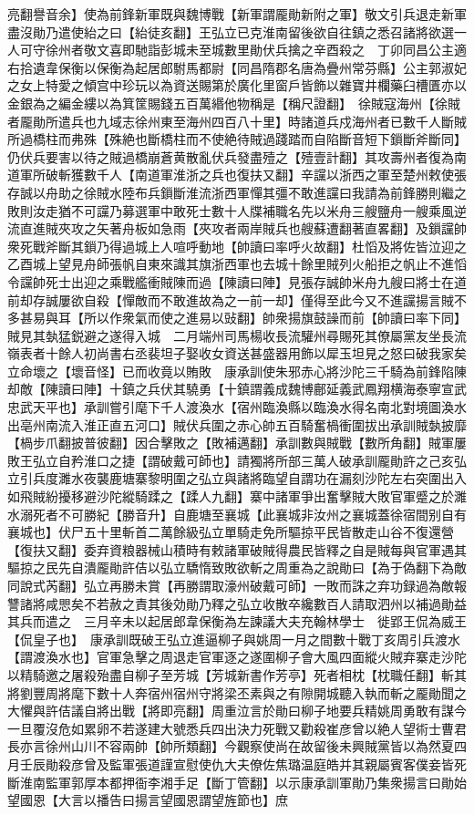 亮翻譽音余】使為前鋒新軍既與魏博戰【新軍謂龎勛新附之軍】敬文引兵退走新軍盡沒勛乃遣使紿之曰【紿徒亥翻】王弘立已克淮南留後欲自往鎮之悉召諸將欲選一人可守徐州者敬文喜即馳詣彭城未至城數里勛伏兵擒之辛酉殺之　丁卯同昌公主適右拾遺韋保衡以保衡為起居郎駙馬都尉【同昌隋郡名唐為疊州常芬縣】公主郭淑妃之女上特愛之傾宫中珍玩以為資送賜第於廣化里窗戶皆飾以雜寶井欄藥臼槽匱亦以金銀為之編金縷以為箕筐賜錢五百萬緡他物稱是【稱尺證翻】　徐賊寇海州【徐賊者龎勛所遣兵也九域志徐州東至海州四百八十里】時諸道兵戍海州者已數千人斷賊所過橋柱而弗殊【殊絶也斷橋柱而不使絶待賊過踐踏而自陷斷音短下鎻斷斧斷同】仍伏兵要害以待之賊過橋崩蒼黄散亂伏兵發盡殪之【殪壹計翻】其攻壽州者復為南道軍所破斬獲數千人【南道軍淮浙之兵也復扶又翻】辛讜以浙西之軍至楚州敕使張存誠以舟助之徐賊水陸布兵鎻斷淮流浙西軍憚其彊不敢進讜曰我請為前鋒勝則繼之敗則汝走猶不可讜乃募選軍中敢死士數十人牒補職名先以米舟三艘鹽舟一艘乘風逆流直進賊夾攻之矢著舟板如急雨【夾攻者兩岸賊兵也艘蘇遭翻著直畧翻】及鎻讜帥衆死戰斧斷其鎻乃得過城上人喧呼動地【帥讀曰率呼火故翻】杜慆及將佐皆泣迎之乙酉城上望見舟師張帆自東來識其旗浙西軍也去城十餘里賊列火船拒之帆止不進慆令讜帥死士出迎之乘戰艦衝賊陳而過【陳讀曰陣】見張存誠帥米舟九艘曰將士在道前却存誠屢欲自殺【憚敵而不敢進故為之一前一却】僅得至此今又不進讜揚言賊不多甚易與耳【所以作衆氣而使之進易以䜴翻】帥衆揚旗鼓譟而前【帥讀曰率下同】賊見其埶猛鋭避之遂得入城　二月端州司馬楊收長流驩州尋賜死其僚屬黨友坐長流嶺表者十餘人初尚書右丞裴坦子娶收女資送甚盛器用飾以犀玉坦見之怒曰破我家矣立命壞之【壞音怪】已而收竟以賄敗　康承訓使朱邪赤心將沙陀三千騎為前鋒陷陳却敵【陳讀曰陣】十鎮之兵伏其驍勇【十鎮謂義成魏博鄜延義武鳳翔横海泰寧宣武忠武天平也】承訓嘗引麾下千人渡渙水【宿州臨渙縣以臨渙水得名南北對境圖渙水出亳州南流入淮正直五河口】賊伏兵圍之赤心帥五百騎奮楇衝圍拔出承訓賊埶披靡【楇步爪翻披普彼翻】因合擊敗之【敗補邁翻】承訓數與賊戰【數所角翻】賊軍屢敗王弘立自矜淮口之捷【謂破戴可師也】請獨將所部三萬人破承訓龎勛許之己亥弘立引兵度濉水夜襲鹿塘寨黎明圍之弘立與諸將臨望自謂功在漏刻沙陀左右突圍出入如飛賊紛擾移避沙陀縱騎蹂之【蹂人九翻】寨中諸軍爭出奮擊賊大敗官軍蹙之於濉水溺死者不可勝紀【勝音升】自鹿塘至襄城【此襄城非汝州之襄城蓋徐宿間别自有襄城也】伏尸五十里斬首二萬餘級弘立單騎走免所驅掠平民皆散走山谷不復還營【復扶又翻】委弃資粮器械山積時有敕諸軍破賊得農民皆釋之自是賊每與官軍遇其驅掠之民先自潰龎勛許佶以弘立驕惰致敗欲斬之周重為之說勛曰【為于偽翻下為敵同說式芮翻】弘立再勝未賞【再勝謂取濠州破戴可師】一敗而誅之弃功録過為敵報讐諸將咸愳矣不若赦之責其後効勛乃釋之弘立收散卒纔數百人請取泗州以補過勛益其兵而遣之　三月辛未以起居郎韋保衡為左諫議大夫充翰林學士　徙郢王侃為威王【侃皇子也】　康承訓既破王弘立進逼柳子與姚周一月之間數十戰丁亥周引兵渡水【謂渡渙水也】官軍急擊之周退走官軍逐之遂圍柳子會大風四面縱火賊弃寨走沙陀以精騎邀之屠殺殆盡自柳子至芳城【芳城新書作芳亭】死者相枕【枕職任翻】斬其將劉豐周將麾下數十人奔宿州宿州守將梁丕素與之有隙開城聽入執而斬之龎勛聞之大懼與許佶議自將出戰【將即亮翻】周重泣言於勛曰柳子地要兵精姚周勇敢有謀今一旦覆沒危如累卵不若遂建大號悉兵四出決力死戰又勸殺崔彦曾以絶人望術士曹君長亦言徐州山川不容兩帥【帥所類翻】今觀察使尚在故留後未興賊黨皆以為然夏四月壬辰勛殺彦曾及監軍張道謹宣慰使仇大夫僚佐焦璐温庭皓并其親屬賓客僕妾皆死斷淮南監軍郭厚本都押衙李湘手足【斷丁管翻】以示康承訓軍勛乃集衆揚言曰勛始望國恩【大言以播告曰揚言望國恩謂望旌節也】庶